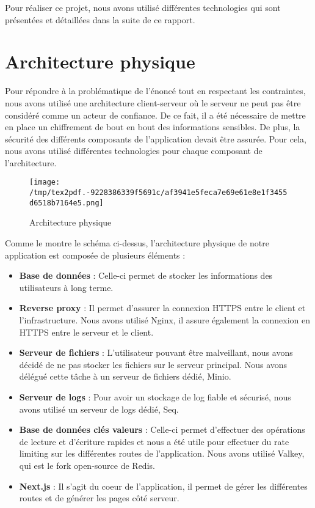 \documentclass[
  11pt,
  paper=a4,
  ,captions=tableheading
]{scrartcl}
\begin{document}
Pour réaliser ce projet, nous avons utilisé différentes technologies qui
sont présentées et détaillées dans la suite de ce rapport.

\newpage

\hypertarget{architecture-physique}{%
\section{Architecture physique}\label{architecture-physique}}

Pour répondre à la problématique de l’énoncé tout en respectant les
contraintes, nous avons utilisé une architecture client-serveur où le
serveur ne peut pas être considéré comme un acteur de confiance. De ce
fait, il a été nécessaire de mettre en place un chiffrement de bout en
bout des informations sensibles. De plus, la sécurité des différents
composants de l’application devait être assurée. Pour cela, nous avons
utilisé différentes technologies pour chaque composant de
l’architecture.

\begin{figure}
\centering
\texttt{[image: /tmp/tex2pdf.-9228386339f5691c/af3941e5feca7e69e61e8e1f3455d6518b7164e5.png]}
\caption{Architecture physique}
\end{figure}

Comme le montre le schéma ci-dessus, l’architecture physique de notre
application est composée de plusieurs éléments :

\begin{itemize}
\item
  \textbf{Base de données} : Celle-ci permet de stocker les informations
  des utilisateurs à long terme.
\item
  \textbf{Reverse proxy} : Il permet d’assurer la connexion HTTPS entre
  le client et l’infrastructure. Nous avons utilisé Nginx, il assure
  également la connexion en HTTPS entre le serveur et le client.
\item
  \textbf{Serveur de fichiers} : L’utilisateur pouvant être malveillant,
  nous avons décidé de ne pas stocker les fichiers sur le serveur
  principal. Nous avons délégué cette tâche à un serveur de fichiers
  dédié, Minio.
\item
  \textbf{Serveur de logs} : Pour avoir un stockage de log fiable et
  sécurisé, nous avons utilisé un serveur de logs dédié, Seq.
\item
  \textbf{Base de données clés valeurs} : Celle-ci permet d’effectuer
  des opérations de lecture et d’écriture rapides et nous a été utile
  pour effectuer du rate limiting sur les différentes routes de
  l’application. Nous avons utilisé Valkey, qui est le fork open-source
  de Redis.
\item
  \textbf{Next.js} : Il s’agit du coeur de l’application, il permet de
  gérer les différentes routes et de générer les pages côté serveur.
\end{itemize}
\end{document}
